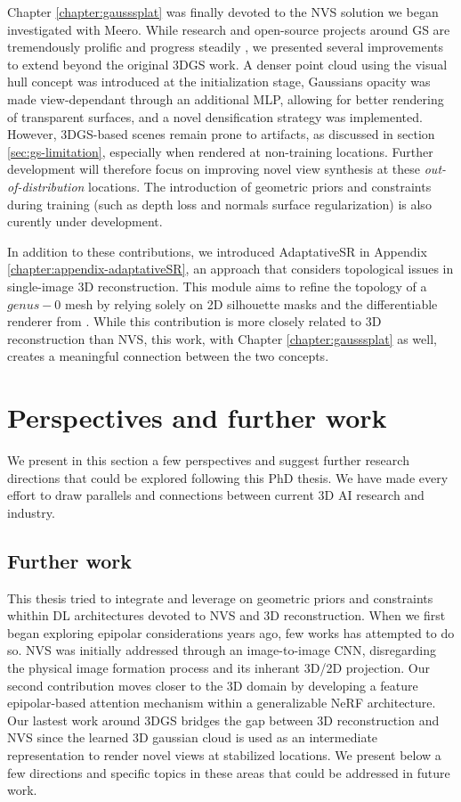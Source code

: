 Chapter \ref{chapter:gausssplat} was finally devoted to the \ac{NVS} solution we began investigated with Meero. While research and open-source projects around \ac{GS} \citep{kerbl20233d} are tremendously prolific and progress steadily \citep{luiten2023dynamic,yang2024gaussianobject,wewer24latentsplat}, we presented several improvements to extend beyond the original 3D\ac{GS} work. A denser point cloud using the visual hull concept was introduced at the initialization stage, Gaussians opacity was made view-dependant through an additional \ac{MLP}, allowing for better rendering of transparent surfaces, and a novel densification strategy was implemented. However, 3D\ac{GS}-based scenes remain prone to artifacts, as discussed in section \ref{sec:gs-limitation}, especially when rendered at non-training locations. Further development will therefore focus on improving novel view synthesis at these \textit{out-of-distribution} locations. The introduction of geometric priors and constraints during training (such as depth loss and normals surface regularization) is also curently under development. 

In addition to these contributions, we introduced AdaptativeSR in Appendix \ref{chapter:appendix-adaptativeSR}, an approach that considers topological issues in single-image 3D reconstruction. This module aims to refine the topology of a $genus-0$ mesh by relying solely on 2D silhouette masks and the differentiable renderer from \citep{liu2019soft}. While this contribution is more closely related to 3D reconstruction than \ac{NVS}, this work, with Chapter \ref{chapter:gausssplat} as well, creates a meaningful connection between the two concepts. 

\section{Perspectives and further work}
We present in this section a few perspectives and suggest further research directions that could be explored following this PhD thesis. We have made every effort to draw parallels and connections between current 3D \ac{AI} research and industry. 

\subsection{Further work}
This thesis tried to integrate and leverage on geometric priors and constraints whithin \ac{DL} architectures devoted to \ac{NVS} and 3D reconstruction. When we first began exploring epipolar considerations years ago, few works has attempted to do so. \ac{NVS} was initially addressed through an image-to-image \ac{CNN}, disregarding the physical image formation process and its inherant 3D/2D projection. Our second contribution moves closer to the 3D domain by developing a feature epipolar-based attention mechanism within a generalizable \ac{NeRF} architecture. Our lastest work around 3D\ac{GS} bridges the gap between 3D reconstruction and \ac{NVS} since the learned 3D gaussian cloud is used as an intermediate representation to render novel views at stabilized locations. We present below a few directions and specific topics in these areas that could be addressed in future work.

